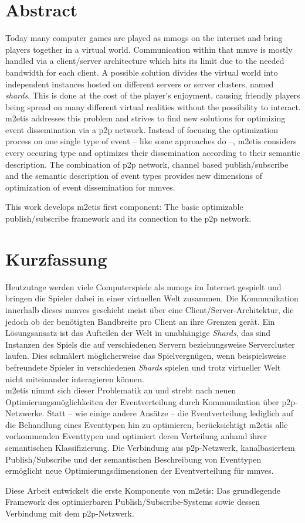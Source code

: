 \chapter*{Abstract}
Today many computer games are played as \acfp{mmog} on the internet and bring players together in a virtual world. Communication within that \acf{mmve} is mostly handled via a client/server architecture which hits its limit due to the needed bandwidth for each client. A possible solution divides the virtual world into independent instances hosted on different servers or server clusters, named \emph{shards}. This is done at the cost of the player's enjoyment, causing friendly players being spread on many different virtual realities without the possibility to interact.\\
\acf{m2etis} addresses this problem and strives to find new solutions for optimizing event dissemination via a \acf{p2p} network. Instead of focusing the optimization process on one single type of event -- like some approaches do --, \ac{m2etis} considers every occuring type and optimizes their dissemination according to their semantic description. The combination of \ac{p2p} network, channel based publish/subscribe and the semantic description of event types provides new dimensions of optimization of event dissemination for \acp{mmve}.

This work develops \ac{m2etis} first component: The basic optimizable publish/subscribe framework and its connection to the \ac{p2p} network.


\clearpage{\pagestyle{empty}\cleardoublepage}
\chapter*{Kurzfassung}
Heutzutage werden viele Computerspiele als \acfp{mmog} im Internet gespielt und bringen die Spieler dabei in einer virtuellen Welt zusammen. Die Kommunikation innerhalb dieses \acfp{mmve} geschieht meist über eine Client/Server-Architektur, die jedoch ob der benötigten Bandbreite pro Client an ihre Grenzen gerät. Ein Lösungsansatz ist das Aufteilen der Welt in unabhängige \emph{Shards}, das sind Instanzen des Spiels die auf verschiedenen Servern beziehungsweise Servercluster laufen. Dies schmälert möglicherweise das Spielvergnügen, wenn beispielsweise befreundete Spieler in verschiedenen \emph{Shards} spielen und trotz virtueller Welt nicht miteinander interagieren können.\\
\acf{m2etis} nimmt sich dieser Problematik an und strebt nach neuen Optimierungsmöglichkeiten der Eventverteilung durch Kommunikation über \acf{p2p}-Netzwerke. Statt -- wie einige andere Ansätze -- die Eventverteilung lediglich auf die Behandlung eines Eventtypen hin zu optimieren, berücksichtigt \ac{m2etis} alle vorkommenden Eventtypen und optimiert deren Verteilung anhand ihrer semantischen Klassifizierung. Die Verbindung aus \ac{p2p}-Netzwerk, kanalbasiertem Publish/Subscribe und der semantischen Beschreibung von Eventtypen ermöglicht neue Optimierungsdimensionen der Eventverteilung für \acp{mmve}.

Diese Arbeit entwickelt die erste Komponente von \ac{m2etis}: Das grundlegende Framework des optimierbaren Publish/Subscribe-Systems sowie dessen Verbindung mit dem \ac{p2p}-Netzwerk.
